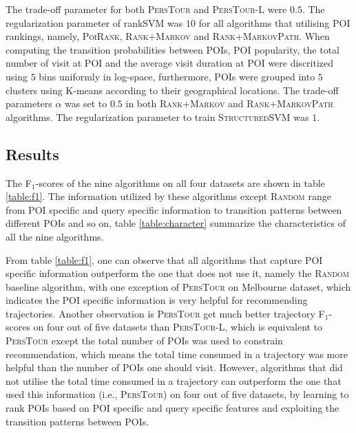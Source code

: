 The trade-off parameter for both \textsc{PersTour} and \textsc{PersTour-L} were $0.5$.
The regularization parameter of rankSVM was $10$ for all algorithms that utilising POI rankings, namely, 
\textsc{PoiRank}, \textsc{Rank+Markov} and \textsc{Rank+MarkovPath}.
When computing the transition probabilities between POIs,
POI popularity, the total number of visit at POI and the average visit duration at POI were discritized using
$5$ bins uniformly in log-space, furthermore, POIs were grouped into $5$ clusters using K-means according to
their geographical locations.
The trade-off parameters $\alpha$ was set to $0.5$ in both \textsc{Rank+Markov} and \textsc{Rank+MarkovPath} algorithms.
The regularization parameter to train \textsc{StructuredSVM} was $1$.


\subsection{Results}
The F$_1$-scores of the nine algorithms on all four datasets are shown in table \ref{table:f1}.
The information utilized by these algorithms except \textsc{Random} range from POI specific and query specific 
information to transition patterns between different POIs and so on, table \ref{table:character} summarize the 
characteristics of all the nine algorithms.

From table \ref{table:f1}, one can observe that all algorithms that capture POI specific information 
outperform the one that does not use it, namely the \textsc{Random} baseline algorithm, 
with one exception of \textsc{PersTour} on Melbourne dataset,
which indicates the POI specific information is very helpful for recommending trajectories.
%
Another observation is \textsc{PersTour} get much better trajectory F$_1$-scores on four out of five datasets 
than \textsc{PersTour-L}, which is equivalent to \textsc{PersTour} except the total number of POIs was used to 
constrain recommendation, which means the total time consumed in a trajectory was more helpful than the number 
of POIs one should visit.
%
However, algorithms that did not utilise the total time consumed in a trajectory can outperform the one that 
used this information (i.e., \textsc{PersTour}) on four out of five datasets, 
by learning to rank POIs based on POI specific and query specific features and exploiting the transition patterns 
between POIs.

